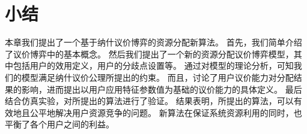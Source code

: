 \section{小结}
本章我们提出了一个基于纳什议价博弈的资源分配新算法。
首先，我们简单介绍了议价博弈中的基本概念。
然后我们提出了一个新的资源分配议价博弈模型，其中包括用户的效用定义，用户的分歧点设置等。
通过对模型的理论分析，可知我们的模型满足纳什议价公理所提出的约束。
而且，讨论了用户议价能力对分配结果的影响，进而提出以用户应用特征参数值为基础的议价能力的具体定义。
最后结合仿真实验，对所提出的算法进行了验证。
结果表明，所提出的算法，可以有效地且公平地解决用户资源竞争的问题。
新算法在保证系统资源利用的同时，也平衡了各个用户之间的利益。


